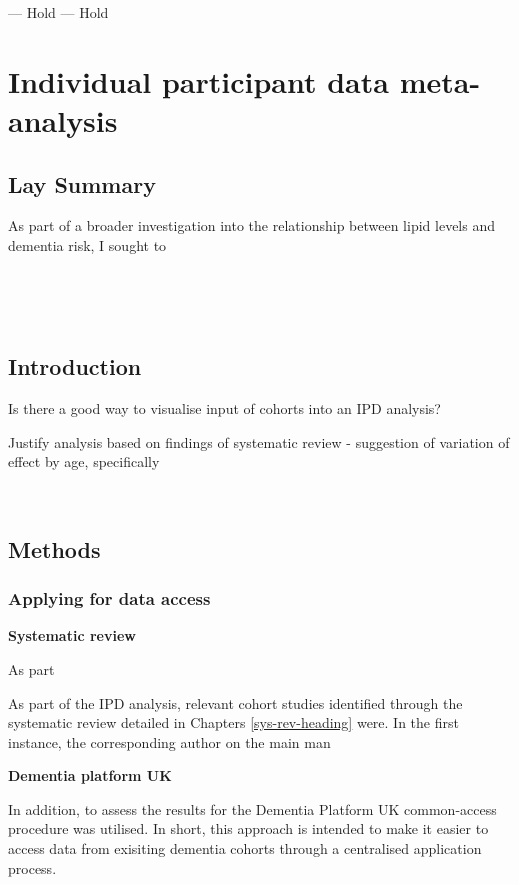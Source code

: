 \documentclass[a4paper, twoside]{templates/ociamthesis}
\begin{document}
--- Hold --- Hold

\hypertarget{ipd-heading}{%
\chapter{Individual participant data meta-analysis}\label{ipd-heading}}

\minitoc 

\hypertarget{lay-summary-4}{%
\section{Lay Summary}\label{lay-summary-4}}

As part of a broader investigation into the relationship between lipid levels and dementia risk, I sought to

~

~

\hypertarget{introduction-2}{%
\section{Introduction}\label{introduction-2}}

Is there a good way to visualise input of cohorts into an IPD analysis?

Justify analysis based on findings of systematic review - suggestion of variation of effect by age, specifically

~

\hypertarget{methods-2}{%
\section{Methods}\label{methods-2}}

\hypertarget{applying-for-data-access}{%
\subsection{Applying for data access}\label{applying-for-data-access}}

\textbf{Systematic review}

As part

As part of the IPD analysis, relevant cohort studies identified through the systematic review detailed in Chapters \ref{sys-rev-heading} were. In the first instance, the corresponding author on the main man

\textbf{Dementia platform UK}

In addition, to assess the results for the Dementia Platform UK common-access procedure was utilised. In short, this approach is intended to make it easier to access data from exisiting dementia cohorts through a centralised application process.
\end{document}
